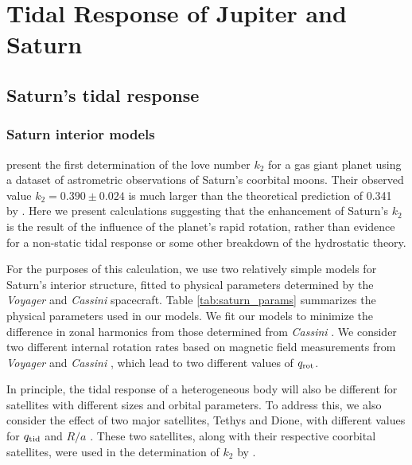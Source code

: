 \chapter{Tidal Response of Jupiter and Saturn}\label{chap7}

\section{Saturn's tidal response} \label{saturn}

\subsection{Saturn interior models}

\citet{lainey2016} present the first determination of the love number $k_2$ for a gas
giant planet using a dataset of astrometric observations of Saturn's coorbital moons.
Their observed value $k_2=0.390 \pm 0.024$ is much larger than the theoretical
prediction of 0.341 by \citet{gavrilov1977}. Here we present calculations suggesting
that the enhancement of Saturn's $k_2$ is the result of the influence of the planet's
rapid rotation, rather than evidence for a non-static tidal response or some other
breakdown of the hydrostatic theory.

For the purposes of this calculation, we use two relatively simple models for
Saturn's interior structure, fitted to physical parameters determined by the
\textit{Voyager} and \textit{Cassini} spacecraft. Table \ref{tab:saturn_params}
summarizes the physical parameters used in our models. We fit our models to minimize
the difference in zonal harmonics from those determined from \textit{Cassini}
\citep{Jacobson2006}.  We consider two different internal rotation rates based on
magnetic field measurements from \textit{Voyager} \citep{desch1981} and
\textit{Cassini} \citep{giampieri2006}, which lead to two different values of $q_{\rm
rot}$. 

In principle, the tidal response of a heterogeneous body will also be different for
satellites with different sizes and orbital parameters. To address this, we also
consider the effect of two major satellites, Tethys and Dione, with different values
for $q_{\rm tid}$ and $R/a$ \citep{archinal2011}. These two satellites, along with
their respective coorbital satellites, were used in the determination of $k_2$ by
\citet{lainey2016}.

